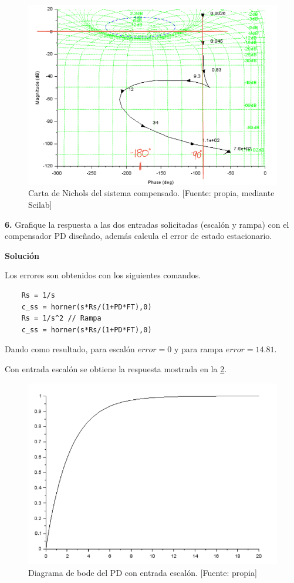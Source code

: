 \documentclass[12pt,letterpaper]{article}
\begin{document}
\begin{figure}[hbtp]
	\centering
	\includegraphics[width = 0.7 \columnwidth]{nichols2.png} 
	\caption[Figura7]{Carta de Nichols del sistema compensado. [Fuente: propia, mediante Scilab]} 
	\label{fig:fig7} 
\end{figure}

\bigskip

\bigskip

\textbf{6.} Grafique la respuesta a las dos entradas solicitadas (escalón y rampa) con el compensador PD diseñado, además calcula el error de estado estacionario.\\

\bigskip

\textbf{Solución}

\bigskip

Los errores son obtenidos con los siguientes comandos.

\begin{verbatim}
    Rs = 1/s 
    c_ss = horner(s*Rs/(1+PD*FT),0)
    Rs = 1/s^2 // Rampa
    c_ss = horner(s*Rs/(1+PD*FT),0)
\end{verbatim}
\bigskip
Dando como resultado, para escalón $error = 0$ y para rampa $error = 14.81$.

Con entrada escalón se obtiene la respuesta mostrada en la \ref{fig:fig8}.

\begin{figure}[hbtp]
	\centering
	\includegraphics[width = .65 \columnwidth]{6escalon.png} 
	\caption[Figura7]{Diagrama de bode del PD con entrada escalón. [Fuente: propia]} 
	\label{fig:fig8} 
\end{figure}
\bigskip
\bigskip
\end{document}
